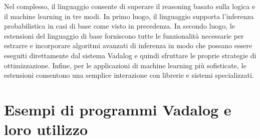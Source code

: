 Nel complesso, il linguaggio consente di superare il reasoning basato sulla logica e il machine learning in tre modi. In primo luogo, il linguaggio supporta l'inferenza probabilistica in casi di base come visto in precedenza. \newline
In secondo luogo, le estensioni del linguaggio di base forniscono tutte le funzionalità necessarie per estrarre e incorporare algoritmi avanzati di inferenza in modo che possano essere eseguiti direttamente dal sistema Vadalog e quindi sfruttare le proprie strategie di ottimizzazione. \newline
Infine, per le applicazioni di machine learning più sofisticate, le estensioni consentono una semplice interazione con librerie e sistemi specializzati.

\section{Esempi di programmi Vadalog e loro utilizzo}
